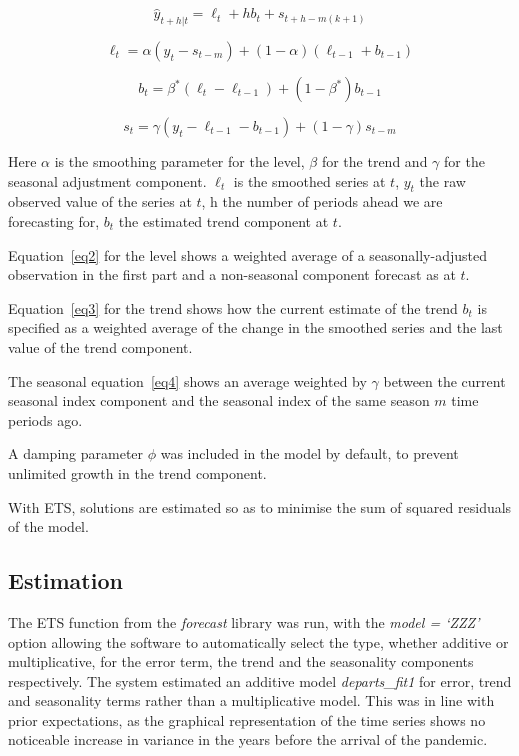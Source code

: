 \documentclass[9pt,technote]{IEEEtran}
\begin{document}
\begin{equation}
\hat{y}_{t+h|t}=\ell_{t} + hb_{t} + s_{t+h-m(k+1)}
\end{equation}

\begin{equation}
\label{eq2}
\ell_{t} = \alpha(y_t - s_{t-m}) + (1-\alpha)(\ell_{t-1} + b_{t-1})
\end{equation}

\begin{equation}
\label{eq3}
b_t = \beta^{*} (\ell_t - \ell_{t-1}) + (1-\beta^{*})b_{t-1}
\end{equation}

\begin{equation}
\label{eq4}
s_t = \gamma(y_t - \ell_{t-1} - b_{t-1}) + (1-\gamma)s_{t-m}
\end{equation}


Here $\alpha$ is the smoothing parameter for the level, $\beta$ for the trend and $\gamma$ for the seasonal adjustment component.  $\ell_t$ is the smoothed series at $t$, $y_t$ the raw observed value of the series at $t$, h the number of periods ahead we are forecasting for, $b_t$ the estimated trend component at $t$.  

Equation~\ref{eq2} for the level shows a weighted average of a seasonally-adjusted observation in the first part and a non-seasonal component forecast as at $t$.  

Equation~\ref{eq3} for the trend shows how the current estimate of the trend $b_t$ is specified as a weighted average of the change in the smoothed series and the last value of the trend component.  

The seasonal equation~\ref{eq4} shows an average weighted by $\gamma$ between the current seasonal index component and the seasonal index of the same season $m$ time periods ago.

A damping parameter $\phi$ was included in the model by default, to prevent unlimited growth in the trend component. 

With ETS, solutions are estimated so as to minimise the sum of squared residuals of the model.  

\subsection{Estimation}

The ETS function from the \textit{forecast} library was run, with the \textit{model = `ZZZ'} option allowing the software to automatically select the type, whether additive or multiplicative, for the error term, the trend and the seasonality components respectively.   The system estimated an additive model \textit{departs\_fit1} for error, trend and seasonality terms rather than a multiplicative model.  This was in line with prior expectations, as the graphical representation of the time series shows no noticeable increase in variance in the years before the arrival of the pandemic.  
\end{document}
